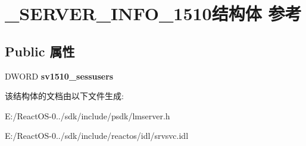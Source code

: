 \hypertarget{struct___s_e_r_v_e_r___i_n_f_o__1510}{}\section{\+\_\+\+S\+E\+R\+V\+E\+R\+\_\+\+I\+N\+F\+O\+\_\+1510结构体 参考}
\label{struct___s_e_r_v_e_r___i_n_f_o__1510}
\subsection*{Public 属性}
\begin{DoxyCompactItemize}
\item 
\mbox{\label{struct___s_e_r_v_e_r___i_n_f_o__1510_ae7febff0807ffbafcfaf10473d3f7860}} 
D\+W\+O\+RD {\bfseries sv1510\+\_\+sessusers}
\end{DoxyCompactItemize}


该结构体的文档由以下文件生成\+:\begin{DoxyCompactItemize}
\item 
E\+:/\+React\+O\+S-\/0../sdk/include/psdk/lmserver.\+h\item 
E\+:/\+React\+O\+S-\/0../sdk/include/reactos/idl/srvsvc.\+idl\end{DoxyCompactItemize}
